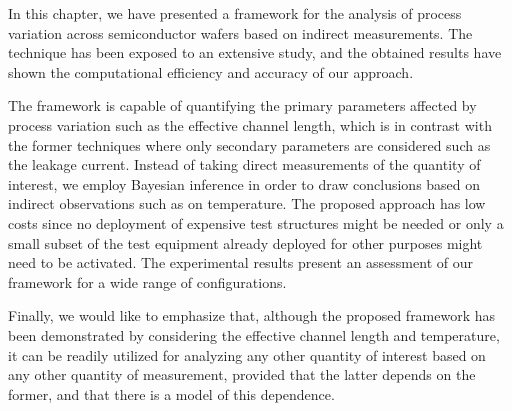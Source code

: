 In this chapter, we have presented a framework for the analysis of process
variation across semiconductor wafers based on indirect measurements. The
technique has been exposed to an extensive study, and the obtained results have
shown the computational efficiency and accuracy of our approach.

The framework is capable of quantifying the primary parameters affected by
process variation such as the effective channel length, which is in contrast
with the former techniques where only secondary parameters are considered such
as the leakage current. Instead of taking direct measurements of the quantity of
interest, we employ Bayesian inference in order to draw conclusions based on
indirect observations such as on temperature. The proposed approach has low
costs since no deployment of expensive test structures might be needed or only a
small subset of the test equipment already deployed for other purposes might
need to be activated. The experimental results present an assessment of our
framework for a wide range of configurations.

Finally, we would like to emphasize that, although the proposed framework has
been demonstrated by considering the effective channel length and temperature,
it can be readily utilized for analyzing any other quantity of interest based on
any other quantity of measurement, provided that the latter depends on the
former, and that there is a model of this dependence.
